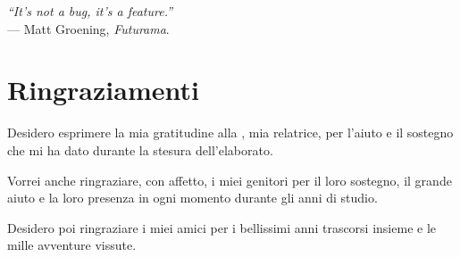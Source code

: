 \cleardoublepage
{}
{}

\begin{flushright}{
    \slshape
    ``It's not a bug, it's a feature.''} \\
    \medskip
    --- Matt Groening, \textit{Futurama}.
\end{flushright}

\begingroup
\let\clearpage\relax
\let\cleardoublepage\relax
\let\cleardoublepage\relax

\chapter*{Ringraziamenti}

\noindent Desidero esprimere la mia gratitudine alla \myProf, mia relatrice, per l'aiuto e il sostegno che mi ha dato durante la stesura dell'elaborato.

\vspace{0.35cm}

\noindent Vorrei anche ringraziare, con affetto, i miei genitori per il loro sostegno, il grande aiuto e la loro presenza in ogni momento durante gli anni di studio.

\vspace{0.35cm}

\noindent Desidero poi ringraziare i miei amici per i bellissimi anni trascorsi insieme e le mille avventure vissute.

\vspace{0.75cm}

\noindent{\myLocation, \myTime}
\hfill \textit{\myName}

\endgroup
